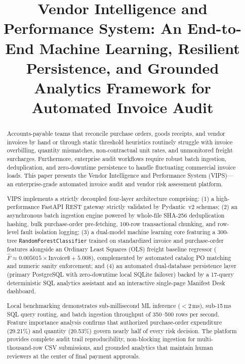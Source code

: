 \documentclass[conference]{IEEEtran}
\begin{document}
\title{Vendor Intelligence and Performance System: An End-to-End Machine Learning, Resilient Persistence, and Grounded Analytics Framework for Automated Invoice Audit}

\author{
}

\maketitle

\begin{abstract}
Accounts-payable teams that reconcile purchase orders, goods receipts, and vendor invoices by hand or through static threshold heuristics routinely struggle with invoice overbilling, quantity mismatches, non-contractual unit rates, and unmonitored freight surcharges. Furthermore, enterprise audit workflows require robust batch ingestion, deduplication, and zero-downtime persistence to handle fluctuating commercial invoice loads. This paper presents the Vendor Intelligence and Performance System (VIPS)---an enterprise-grade automated invoice audit and vendor risk assessment platform. 

VIPS implements a strictly decoupled four-layer architecture comprising: (1) a high-performance FastAPI REST gateway strictly validated by Pydantic~v2 schemas; (2) an asynchronous batch ingestion engine powered by whole-file SHA-256 deduplication hashing, bulk purchase-order pre-fetching, 100-row transactional chunking, and row-level fault isolation logging; (3) a dual-model machine learning core featuring a 300-tree \texttt{RandomForestClassifier} trained on standardized invoice and purchase-order features alongside an Ordinary Least Squares (OLS) freight baseline regressor ($\hat{F} \approx 0.005015 \times \text{Invoice\$} + 5.008$), complemented by automated catalog PO matching and numeric sanity enforcement; and (4) an automated dual-database persistence layer (primary PostgreSQL with zero-downtime local SQLite failover) backed by a 17-query deterministic SQL analytics assistant and an interactive single-page Manifest Desk dashboard. 

Local benchmarking demonstrates sub-millisecond ML inference ($<2$\,ms), sub-15\,ms SQL query routing, and batch ingestion throughput of 350--500 rows per second. Feature importance analysis confirms that authorized purchase-order expenditure (29.21\%) and quantity (20.53\%) govern nearly half of every risk decision. The platform provides complete audit trail reproducibility, non-blocking ingestion for multi-thousand-row CSV submissions, and grounded analytics that maintain human reviewers at the center of final payment approvals.
\end{abstract}
\end{document}
